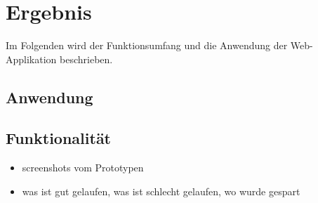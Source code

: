 \chapter{Ergebnis}
\label{cha:ergebnis}
Im Folgenden wird der Funktionsumfang und die Anwendung der Web-Applikation beschrieben.

\section{Anwendung}


\section{Funktionalität}


\begin{itemize}
	\item screenshots vom Prototypen
	\item was ist gut gelaufen, was ist schlecht gelaufen, wo wurde gespart
\end{itemize}